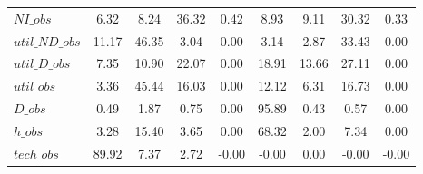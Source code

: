 \begin{center}
\begin{longtable}{lcccccccc}
$NI\_obs        $	 & 	         6.32	 & 	         8.24	 & 	        36.32	 & 	         0.42	 & 	         8.93	 & 	         9.11	 & 	        30.32	 & 	         0.33 \\ 
$util\_ND\_obs  $	 & 	        11.17	 & 	        46.35	 & 	         3.04	 & 	         0.00	 & 	         3.14	 & 	         2.87	 & 	        33.43	 & 	         0.00 \\ 
$util\_D\_obs   $	 & 	         7.35	 & 	        10.90	 & 	        22.07	 & 	         0.00	 & 	        18.91	 & 	        13.66	 & 	        27.11	 & 	         0.00 \\ 
$util\_obs      $	 & 	         3.36	 & 	        45.44	 & 	        16.03	 & 	         0.00	 & 	        12.12	 & 	         6.31	 & 	        16.73	 & 	         0.00 \\ 
$D\_obs         $	 & 	         0.49	 & 	         1.87	 & 	         0.75	 & 	         0.00	 & 	        95.89	 & 	         0.43	 & 	         0.57	 & 	         0.00 \\ 
$h\_obs         $	 & 	         3.28	 & 	        15.40	 & 	         3.65	 & 	         0.00	 & 	        68.32	 & 	         2.00	 & 	         7.34	 & 	         0.00 \\ 
$tech\_obs      $	 & 	        89.92	 & 	         7.37	 & 	         2.72	 & 	        -0.00	 & 	        -0.00	 & 	         0.00	 & 	        -0.00	 & 	        -0.00 \\ 
\end{longtable}
 \end{center}
